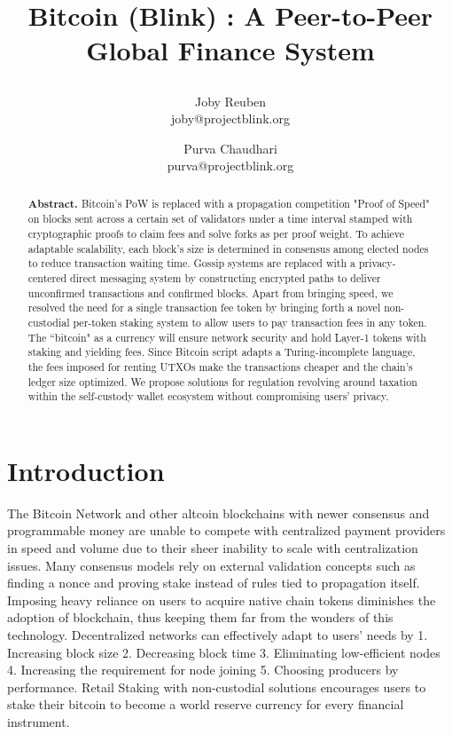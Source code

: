 \documentclass[a4paper,	10pt]{extarticle}
\title{
 \large \textbf{Bitcoin (Blink) : A Peer-to-Peer Global Finance System}
\author{ \myfontt Joby Reuben \\ \myfontt joby@projectblink.org \and  \myfontt Purva Chaudhari \\ \myfontt purva@projectblink.org}}
\date{}
\begin{document}
\maketitle
\begin{abstract}
\noindent \textbf{Abstract.} Bitcoin's PoW is replaced with a propagation competition "Proof of Speed" on blocks sent across a certain set of validators under a time interval stamped with cryptographic proofs to claim fees and solve forks as per proof weight. To achieve adaptable scalability, each block's size is determined in consensus among elected nodes to reduce transaction waiting time. Gossip systems are replaced with a privacy-centered direct messaging system by constructing encrypted paths to deliver unconfirmed transactions and confirmed blocks. Apart from bringing speed, we resolved the need for a single transaction fee token by bringing forth a novel non-custodial per-token staking system to allow users to pay transaction fees in any token. The ``bitcoin" as a currency will ensure network security and hold Layer-1 tokens with staking and yielding fees. Since Bitcoin script adapts a Turing-incomplete language, the fees imposed for renting UTXOs make the transactions cheaper and the chain's ledger size optimized. We propose solutions for regulation revolving around taxation within the self-custody wallet ecosystem without compromising users' privacy. 
\end{abstract}
\section{Introduction}
The Bitcoin Network \cite{nakamoto2008bitcoin} and other altcoin blockchains with newer consensus and programmable money are unable to compete with centralized payment providers in speed and volume due to their sheer inability to scale with centralization issues. Many consensus models rely on external validation concepts such as finding a nonce and proving stake instead of rules tied to propagation itself. Imposing heavy reliance on users to acquire native chain tokens diminishes the adoption of blockchain, thus keeping them far from the wonders of this technology. Decentralized networks can effectively adapt to users’ needs by 1. Increasing block size 2. Decreasing block time 3. Eliminating low-efficient nodes 4. Increasing the requirement for node joining 5. Choosing producers by performance. Retail Staking with non-custodial solutions encourages users to stake their bitcoin to become a world reserve currency for every financial instrument.
\end{document}
